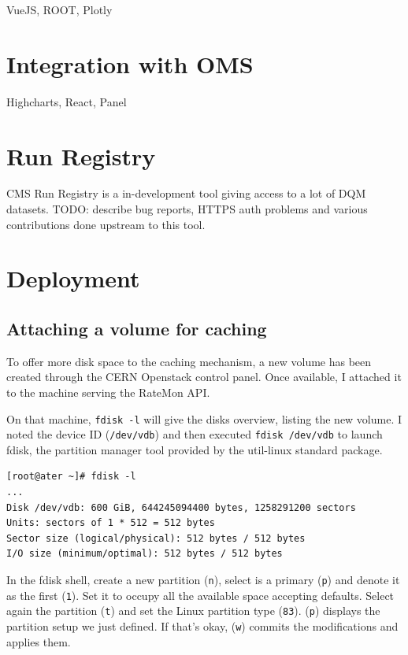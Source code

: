 VueJS, ROOT, Plotly

\section{Integration with OMS}

Highcharts, React, Panel

\section{Run Registry}

CMS Run Registry is a in-development tool giving access to a lot of DQM datasets. TODO: describe bug reports, HTTPS auth problems and various contributions done upstream to this tool.


\section{Deployment}

\subsection{Attaching a volume for caching}

To offer more disk space to the caching mechanism, a new volume has been created through the CERN Openstack control panel. Once available, I attached it to the machine serving the RateMon API.

On that machine, \texttt{fdisk -l} will give the disks overview, listing the new volume. I noted the device ID (\texttt{/dev/vdb}) and then executed \texttt{fdisk /dev/vdb} to launch fdisk, the partition manager tool provided by the util-linux standard package.

\begin{verbatim}
[root@ater ~]# fdisk -l
...
Disk /dev/vdb: 600 GiB, 644245094400 bytes, 1258291200 sectors
Units: sectors of 1 * 512 = 512 bytes
Sector size (logical/physical): 512 bytes / 512 bytes
I/O size (minimum/optimal): 512 bytes / 512 bytes
\end{verbatim}

In the fdisk shell, create a new partition (\texttt{n}), select is a primary (\texttt{p}) and denote it as the first (\texttt{1}). Set it to occupy all the available space accepting defaults. Select again the partition (\texttt{t}) and set the Linux partition type (\texttt{83}). (\texttt{p}) displays the partition setup we just defined. If that's okay, (\texttt{w}) commits the modifications and applies them.

